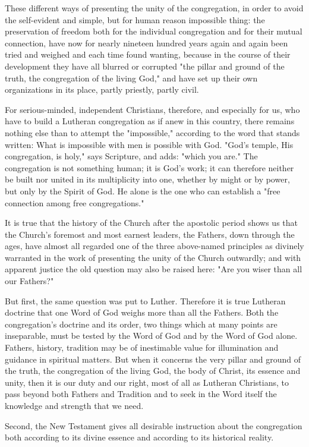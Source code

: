 These different ways of presenting the unity of the congregation, in order to avoid the self-evident and simple, but for human reason impossible thing: the preservation of freedom both for the individual congregation and for their mutual connection, have now for nearly nineteen hundred years again and again been tried and weighed and each time found wanting, because in the course of their development they have all blurred or corrupted "the pillar and ground of the truth, the congregation of the living God," and have set up their own organizations in its place, partly priestly, partly civil.

For serious-minded, independent Christians, therefore, and especially for us, who have to build a Lutheran congregation as if anew in this country, there remains nothing else than to attempt the "impossible," according to the word that stands written: What is impossible with men is possible with God. "God’s temple, His congregation, is holy," says Scripture, and adds: "which you are." The congregation is not something human; it is God’s work; it can therefore neither be built nor united in its multiplicity into one, whether by might or by power, but only by the Spirit of God. He alone is the one who can establish a "free connection among free congregations."

It is true that the history of the Church after the apostolic period shows us that the Church’s foremost and most earnest leaders, the Fathers, down through the ages, have almost all regarded one of the three above-named principles as divinely warranted in the work of presenting the unity of the Church outwardly; and with apparent justice the old question may also be raised here: "Are you wiser than all our Fathers?"

But first, the same question was put to Luther. Therefore it is true Lutheran doctrine that one Word of God weighs more than all the Fathers. Both the congregation’s doctrine and its order, two things which at many points are inseparable, must be tested by the Word of God and by the Word of God alone. Fathers, history, tradition may be of inestimable value for illumination and guidance in spiritual matters. But when it concerns the very pillar and ground of the truth, the congregation of the living God, the body of Christ, its essence and unity, then it is our duty and our right, most of all as Lutheran Christians, to pass beyond both Fathers and Tradition and to seek in the Word itself the knowledge and strength that we need.

Second, the New Testament gives all desirable instruction about the congregation both according to its divine essence and according to its historical reality.

